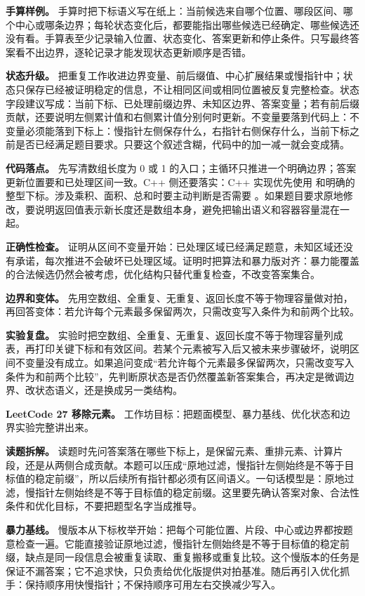 \textbf{手算样例。} 手算时把下标语义写在纸上：当前候选来自哪个位置、哪段区间、哪个中心或哪条边界；每轮状态变化后，都要能指出哪些候选已经确定、哪些候选还没有看。手算表至少记录输入位置、状态变化、答案更新和停止条件。只写最终答案看不出边界，逐轮记录才能发现状态更新顺序是否错。

\textbf{状态升级。} 把重复工作收进边界变量、前后缀值、中心扩展结果或慢指针中；状态只保存已经被证明稳定的信息，不让相同区间或相同位置被反复完整检查。状态字段建议写成：当前下标、已处理前缀边界、未知区边界、答案变量；若有前后缀贡献，还要说明左侧累计值和右侧累计值分别何时更新。不变量要落到代码上：不变量必须能落到下标上：慢指针左侧保存什么，右指针右侧保存什么，当前下标之前是否已经满足题目要求。只要这个叙述含糊，代码中的加一减一就会变成猜。

\textbf{代码落点。} 先写清数组长度为 0 或 1 的入口；主循环只推进一个明确边界；答案更新位置要和已处理区间一致。C++ 侧还要落实：C++ 实现优先使用  和明确的整型下标。涉及乘积、面积、总和时要主动判断是否需要 。如果题目要求原地修改，要说明返回值表示新长度还是数组本身，避免把输出语义和容器容量混在一起。

\textbf{正确性检查。} 证明从区间不变量开始：已处理区域已经满足题意，未知区域还没有承诺，每次推进不会破坏已处理区域。证明时把算法和暴力版对齐：暴力能覆盖的合法候选仍然会被考虑，优化结构只替代重复检查，不改变答案集合。

\textbf{边界和变体。} 先用空数组、全重复、无重复、返回长度不等于物理容量做对拍，再回答变体：若允许每个元素最多保留两次，只需改变写入条件为和前两个比较。

\textbf{实验复盘。} 实验时把空数组、全重复、无重复、返回长度不等于物理容量列成表，再打印关键下标和有效区间。若某个元素被写入后又被未来步骤破坏，说明区间不变量没有成立。如果追问变成“若允许每个元素最多保留两次，只需改变写入条件为和前两个比较”，先判断原状态是否仍然覆盖新答案集合，再决定是微调边界、改状态语义，还是换成另一类结构。

\noindent\textbf{LeetCode 27 移除元素。} 工作坊目标：把题面模型、暴力基线、优化状态和边界实验完整讲出来。

\textbf{读题拆解。} 读题时先问答案落在哪些下标上，是保留元素、重排元素、计算片段，还是从两侧合成贡献。本题可以压成“原地过滤，慢指针左侧始终是不等于目标值的稳定前缀”，所以后续所有指针都必须有区间语义。一句话模型是：原地过滤，慢指针左侧始终是不等于目标值的稳定前缀。这里要先确认答案对象、合法性条件和优化目标，不要把题型名字当成推导。

\textbf{暴力基线。} 慢版本从下标枚举开始：把每个可能位置、片段、中心或边界都按题意检查一遍。它能直接验证原地过滤，慢指针左侧始终是不等于目标值的稳定前缀，缺点是同一段信息会被重复读取、重复搬移或重复比较。这个慢版本的任务是保证不漏答案；它不追求快，只负责给优化版提供对拍基准。随后再引入优化抓手：保持顺序用快慢指针；不保持顺序可用左右交换减少写入。

